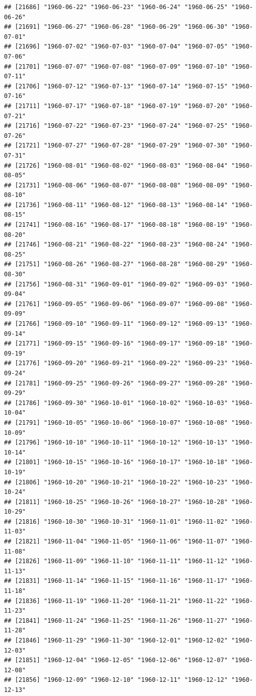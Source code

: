 \documentclass{article}\usepackage[]{graphicx}\usepackage[]{color}
\makeatletter
\newenvironment{kframe}{%
 \def\at@end@of@kframe{}%
 \ifinner\ifhmode%
  \def\at@end@of@kframe{\end{minipage}}%
  \begin{minipage}{\columnwidth}%
 \fi\fi%
 \def\FrameCommand##1{\hskip\@totalleftmargin \hskip-\fboxsep
 \colorbox{shadecolor}{##1}\hskip-\fboxsep
     \hskip-\linewidth \hskip-\@totalleftmargin \hskip\columnwidth}%
 \MakeFramed {\advance\hsize-\width
   \@totalleftmargin\z@ \linewidth\hsize
   \@setminipage}}%
 {\par\unskip\endMakeFramed%
 \at@end@of@kframe}
\newenvironment{knitrout}{}{} %
\makeatother
\begin{document}
\begin{description}
\begin{knitrout}
\begin{kframe}
\begin{verbatim}
## [21686] "1960-06-22" "1960-06-23" "1960-06-24" "1960-06-25" "1960-06-26"
## [21691] "1960-06-27" "1960-06-28" "1960-06-29" "1960-06-30" "1960-07-01"
## [21696] "1960-07-02" "1960-07-03" "1960-07-04" "1960-07-05" "1960-07-06"
## [21701] "1960-07-07" "1960-07-08" "1960-07-09" "1960-07-10" "1960-07-11"
## [21706] "1960-07-12" "1960-07-13" "1960-07-14" "1960-07-15" "1960-07-16"
## [21711] "1960-07-17" "1960-07-18" "1960-07-19" "1960-07-20" "1960-07-21"
## [21716] "1960-07-22" "1960-07-23" "1960-07-24" "1960-07-25" "1960-07-26"
## [21721] "1960-07-27" "1960-07-28" "1960-07-29" "1960-07-30" "1960-07-31"
## [21726] "1960-08-01" "1960-08-02" "1960-08-03" "1960-08-04" "1960-08-05"
## [21731] "1960-08-06" "1960-08-07" "1960-08-08" "1960-08-09" "1960-08-10"
## [21736] "1960-08-11" "1960-08-12" "1960-08-13" "1960-08-14" "1960-08-15"
## [21741] "1960-08-16" "1960-08-17" "1960-08-18" "1960-08-19" "1960-08-20"
## [21746] "1960-08-21" "1960-08-22" "1960-08-23" "1960-08-24" "1960-08-25"
## [21751] "1960-08-26" "1960-08-27" "1960-08-28" "1960-08-29" "1960-08-30"
## [21756] "1960-08-31" "1960-09-01" "1960-09-02" "1960-09-03" "1960-09-04"
## [21761] "1960-09-05" "1960-09-06" "1960-09-07" "1960-09-08" "1960-09-09"
## [21766] "1960-09-10" "1960-09-11" "1960-09-12" "1960-09-13" "1960-09-14"
## [21771] "1960-09-15" "1960-09-16" "1960-09-17" "1960-09-18" "1960-09-19"
## [21776] "1960-09-20" "1960-09-21" "1960-09-22" "1960-09-23" "1960-09-24"
## [21781] "1960-09-25" "1960-09-26" "1960-09-27" "1960-09-28" "1960-09-29"
## [21786] "1960-09-30" "1960-10-01" "1960-10-02" "1960-10-03" "1960-10-04"
## [21791] "1960-10-05" "1960-10-06" "1960-10-07" "1960-10-08" "1960-10-09"
## [21796] "1960-10-10" "1960-10-11" "1960-10-12" "1960-10-13" "1960-10-14"
## [21801] "1960-10-15" "1960-10-16" "1960-10-17" "1960-10-18" "1960-10-19"
## [21806] "1960-10-20" "1960-10-21" "1960-10-22" "1960-10-23" "1960-10-24"
## [21811] "1960-10-25" "1960-10-26" "1960-10-27" "1960-10-28" "1960-10-29"
## [21816] "1960-10-30" "1960-10-31" "1960-11-01" "1960-11-02" "1960-11-03"
## [21821] "1960-11-04" "1960-11-05" "1960-11-06" "1960-11-07" "1960-11-08"
## [21826] "1960-11-09" "1960-11-10" "1960-11-11" "1960-11-12" "1960-11-13"
## [21831] "1960-11-14" "1960-11-15" "1960-11-16" "1960-11-17" "1960-11-18"
## [21836] "1960-11-19" "1960-11-20" "1960-11-21" "1960-11-22" "1960-11-23"
## [21841] "1960-11-24" "1960-11-25" "1960-11-26" "1960-11-27" "1960-11-28"
## [21846] "1960-11-29" "1960-11-30" "1960-12-01" "1960-12-02" "1960-12-03"
## [21851] "1960-12-04" "1960-12-05" "1960-12-06" "1960-12-07" "1960-12-08"
## [21856] "1960-12-09" "1960-12-10" "1960-12-11" "1960-12-12" "1960-12-13"

\end{verbatim}
\end{kframe}
\end{knitrout}
\end{description}
\end{document}

